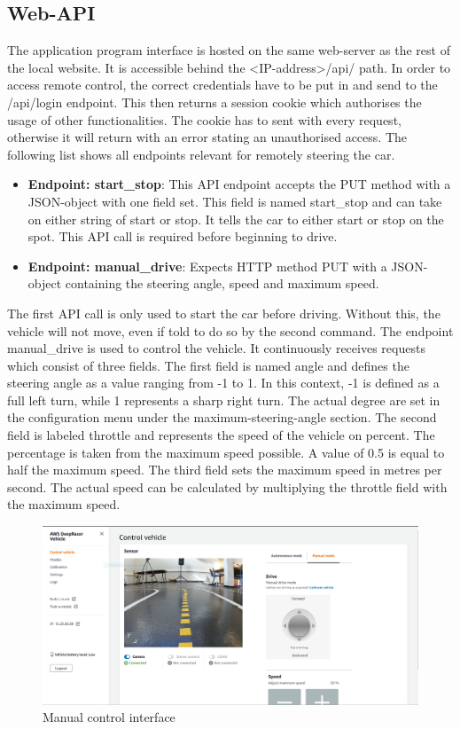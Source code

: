 \subsection{Web-API}
The application program interface is hosted on the same web-server as the rest of the local website. It is accessible behind the <IP-address>/api/ path. In order to access remote control, the correct credentials have to be put in and send to the /api/login endpoint. This then returns a session cookie which authorises the usage of other functionalities. The cookie has to sent with every request, otherwise it will return with an error stating an unauthorised access. The following list shows all endpoints relevant for remotely steering the car.

\begin{itemize}
    \item \textbf{Endpoint: start\_stop}: This API endpoint accepts the PUT method with a JSON-object with one field set. This field is named start\_stop and can take on either string of start or stop. It tells the car to either start or stop on the spot. This API call is required before beginning to drive.
    \item \textbf{Endpoint: manual\_drive}: Expects HTTP method PUT with a JSON-object containing the steering angle, speed and maximum speed.
\end{itemize}

The first API call is only used to start the car before driving. Without this, the vehicle will not move, even if told to do so by the second command. The endpoint manual\_drive is used to control the vehicle. It continuously receives requests which consist of three fields. The first field is named angle and defines the steering angle as a value ranging from -1 to 1. In this context, -1 is defined as a full left turn, while 1 represents a sharp right turn. The actual degree are set in the configuration menu under the maximum-steering-angle section. The second field is labeled throttle and represents the speed of the vehicle on percent. The percentage is taken from the maximum speed possible. A value of 0.5 is equal to half the maximum speed. The third field sets the maximum speed in metres per second. The actual speed can be calculated by multiplying the throttle field with the maximum speed.

\begin{figure}
    \centering
    \includegraphics[width=.85\textwidth]{images/manual-control.png}
    \caption{Manual control interface}
    \label{fig:manual_control}
\end{figure}
